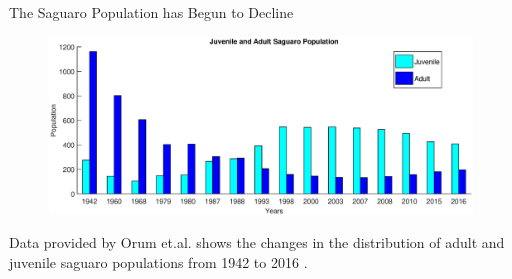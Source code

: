 \documentclass{beamer}
\begin{document}
\begin{frame}{The Saguaro Population has Begun to Decline}
\begin{center}
\begin{figure}
\includegraphics[scale=.37]{sagpop.eps}
\end{figure}
\end{center}
\small{Data provided by Orum et.al. shows the changes in the distribution of adult and juvenile saguaro populations from 1942 to 2016 \cite{OrumData}.}
\end{frame}
\end{document}
